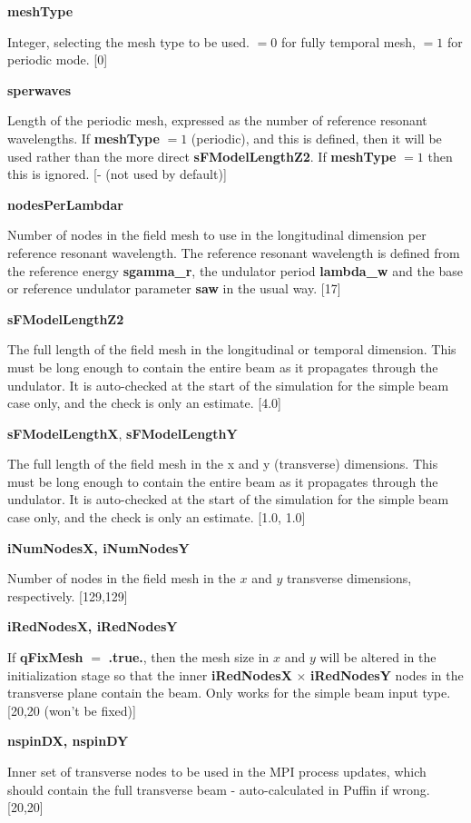 \documentclass[12pt]{article}%
\begin{document}
{\bf meshType}

Integer, selecting the mesh type to be used. $= 0$ for fully temporal mesh, $=1$ for periodic mode. [0]

{\bf sperwaves}

Length of the periodic mesh, expressed as the number of reference resonant wavelengths. If {\bf meshType} $=1$ (periodic), and this is defined, then it will be used rather than the more direct {\bf sFModelLengthZ2}. If {\bf meshType} $=1$ then this is ignored. [- (not used by default)] 

{\bf nodesPerLambdar}

Number of nodes in the field mesh to use in the longitudinal dimension per reference resonant wavelength. The reference resonant wavelength is defined from the reference energy {\bf sgamma\_r}, the undulator period {\bf lambda\_w} and the base or reference undulator parameter {\bf saw} in the usual way. [17]

{\bf sFModelLengthZ2}

The full length of the field mesh in the longitudinal or temporal dimension. This must be long enough to contain the entire beam as it propagates through the undulator. It is auto-checked at the start of the simulation for the simple beam case only, and the check is only an estimate. [4.0]

{\bf sFModelLengthX}, {\bf sFModelLengthY}

The full length of the field mesh in the x and y (transverse) dimensions. This must be long enough to contain the entire beam as it propagates through the undulator. It is auto-checked at the start of the simulation for the simple beam case only, and the check is only an estimate. [1.0, 1.0]

{\bf iNumNodesX, iNumNodesY}

Number of nodes in the field mesh in the $x$ and $y$ transverse dimensions, respectively. [129,129]

{\bf iRedNodesX, iRedNodesY}

If {\bf qFixMesh} $=$ {\bf .true.}, then the mesh size in $x$ and $y$ will be altered in the initialization stage so that the inner {\bf iRedNodesX} $\times$ {\bf iRedNodesY} nodes in the transverse plane contain the beam. Only works for the simple beam input type. [20,20 (won't be fixed)]

{\bf nspinDX, nspinDY}

Inner set of transverse nodes to be used in the MPI process updates, which should contain the full transverse beam - auto-calculated in Puffin if wrong. [20,20]
\end{document}

